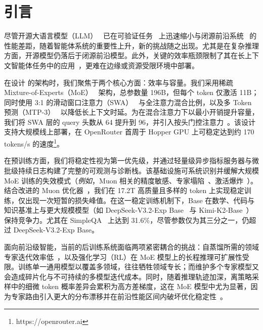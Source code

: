 \newpage
\section{引言}
\label{sec:intro}
尽管开源大语言模型（LLM）~\cite{deepseekai2024deepseekv32, zeng2025glm, xiao2026mimov2flashtechnicalreport, team2025longcat, kimi_k2, minimax_m2p1} 已在可验证任务~\cite{10.5555/3524938.3525416,hmmt25,jain2024livecodebench} 上迅速缩小与闭源前沿系统~\cite{gpt_5p2,gemini_3,opus} 的性能差距，随着智能体系统的重要性上升，新的挑战随之出现。尤其是在复杂推理方面，开源模型仍落后于闭源前沿模型。此外，关键的效率瓶颈限制了其在长上下文智能体任务中的应用~\cite{swe_verified,yang2025swesmith,tau2bench2025,terminalbench2025,wei2025browsecomp,zhou2025browsecompzhbenchmarkingwebbrowsing,mialon2023gaiabenchmarkgeneralai,chen2025xbench,sharma2025researchrubrics}，更难在边缘或资源受限环境中部署。


在设计 \ourmodel 的架构时，我们聚焦于两个核心方面：效率与容量。我们采用稀疏 Mixture-of-Experts（MoE）~\cite{fedus2021switchtransformers,zoph2022stmoedesigningstabletransferable,pmlr-v162-du22c,lepikhin2020gshardscalinggiantmodels,dai2024deepseekmoeultimateexpertspecialization} 架构，总参数量 196B，但每个 token 仅激活 11B；同时使用 3:1 的滑动窗口注意力（SWA）~\cite{DBLP:journals/corr/abs-1904-10509} 与全注意力混合比例，以及多 Token 预测（MTP-3）~\cite{gloeckle2024better,deepseek2024deepseekv3,xiaomi2025mimo,xiao2026mimov2flashtechnicalreport} 以降低长上下文时延。为在混合注意力下以最小开销提升容量，我们将 SWA 层的 query 头数从 64 提升到 96，并引入按头门控注意力~\cite{qiu2025gatedattentionlargelanguage}。该设计支持大规模线上部署，在 OpenRouter 首周于 Hopper GPU 上可稳定达到约 170 tokens/s 的速度\footnote{https://openrouter.ai}。


在预训练方面，我们将稳定性视为第一优先级，并通过轻量级异步指标服务器与微批级持续日志构建了完整的可观测与诊断栈。该基础设施可系统识别并缓解大规模 MoE 训练的失效模式（\textit{例如}，Muon 相关的精度敏感、专家塌陷~\cite{step3blog}、激活爆炸~\cite{kimi_k2,openai2025gptoss120bgptoss20bmodel}）。结合改进的 Muon 优化器~\cite{jordan2024muon}，我们在 17.2T 高质量且多样的 token 上实现稳定训练，仅出现一次短暂的损失峰值。在这一稳定训练机制下，\ourmodel Base 在数学、代码与知识基准上与更大规模模型（如 DeepSeek-V3.2-Exp Base~\cite{deepseekai2024deepseekv32} 与 Kimi-K2-Base~\cite{kimi_k2}）保持竞争力。尤其在 SimpleQA~\cite{wei2024measuring} 上达到 31.6\%，尽管参数仅为其三分之一，仍超过 DeepSeek-V3.2-Exp Base。


面向前沿级智能，当前的后训练系统面临两项紧密耦合的挑战：自蒸馏所需的领域专家迭代效率低~\cite{deepseekai2024deepseekv32, zeng2025glm, xiao2026mimov2flashtechnicalreport, team2025longcat}，以及强化学习（RL）在 MoE 模型上的长程推理可扩展性受限。训练单一通用模型以覆盖多领域，往往牺牲领域专长；而维护多个专家模型又会造成碎片化与不可持续的多模型迭代成本。同时，随着推理轨迹加深，离策略采样中的细微 token 概率差异会累积为高方差梯度，这在 MoE 模型中尤为显著，因为专家路由引入更大的分布漂移并在前沿性能区间内破坏优化稳定性~\cite{zheng2025group,yao2025offpolicy,ma2025stabilizing,deepseekai2024deepseekv32}。

